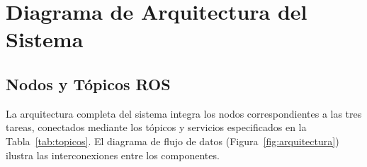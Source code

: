 \documentclass[12pt,letterpaper]{article}
\begin{document}
\section{Diagrama de Arquitectura del Sistema}
\label{sec:arquitectura}

\subsection{Nodos y Tópicos ROS}

La arquitectura completa del sistema integra los nodos correspondientes a las tres tareas, conectados mediante los tópicos y servicios especificados en la Tabla~\ref{tab:topicos}. El diagrama de flujo de datos (Figura~\ref{fig:arquitectura}) ilustra las interconexiones entre los componentes.
\end{document}
